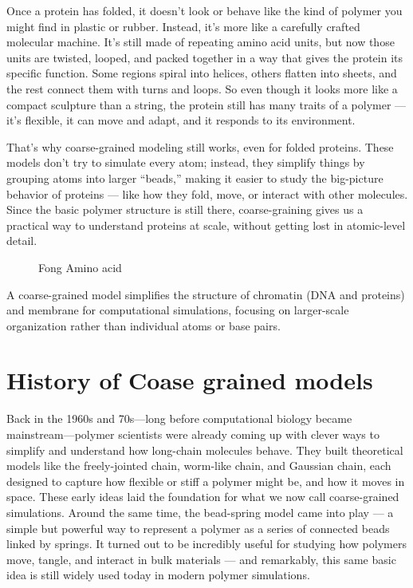 \documentclass[12pt]{article}
\begin{document}
\begin{flushleft}
Once a protein has folded, it doesn’t look or behave like the kind of polymer you might find in plastic or rubber. Instead, it’s more like a carefully crafted molecular machine. It’s still made of repeating amino acid units, but now those units are twisted, looped, and packed together in a way that gives the protein its specific function. Some regions spiral into helices, others flatten into sheets, and the rest connect them with turns and loops. So even though it looks more like a compact sculpture than a string, the protein still has many traits of a polymer — it’s flexible, it can move and adapt, and it responds to its environment.

That’s why coarse-grained modeling still works, even for folded proteins. These models don’t try to simulate every atom; instead, they simplify things by grouping atoms into larger “beads,” making it easier to study the big-picture behavior of proteins — like how they fold, move, or interact with other molecules. Since the basic polymer structure is still there, coarse-graining gives us a practical way to understand proteins at scale, without getting lost in atomic-level detail.

\begin{figure}[!ht]
  \centering
  
  \caption{Fong Amino acid }
\end{figure}









A coarse-grained model simplifies the structure of chromatin  (DNA and proteins) and membrane for computational simulations, focusing on larger-scale organization rather than individual atoms or base pairs.


\section*{History of Coase grained models }

Back in the 1960s and 70s—long before computational biology became mainstream—polymer scientists were already coming up with clever ways to simplify and understand how long-chain molecules behave. They built theoretical models like the freely-jointed chain, worm-like chain, and Gaussian chain, each designed to capture how flexible or stiff a polymer might be, and how it moves in space. These early ideas laid the foundation for what we now call coarse-grained simulations. Around the same time, the bead-spring model came into play — a simple but powerful way to represent a polymer as a series of connected beads linked by springs. It turned out to be incredibly useful for studying how polymers move, tangle, and interact in bulk materials — and remarkably, this same basic idea is still widely used today in modern polymer simulations.\\


\end{flushleft}
\end{document}
